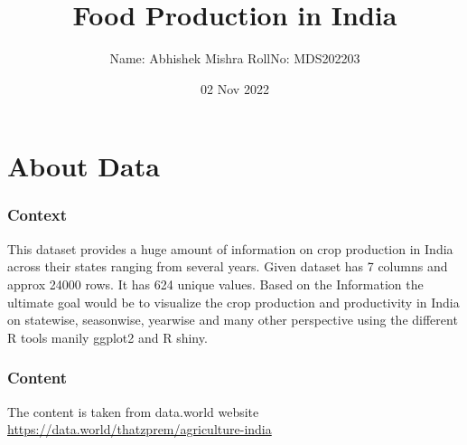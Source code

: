 \documentclass[
]{article}
\title{Food Production in India}
\author{Name: Abhishek Mishra \textbar{} RollNo: MDS202203}
\date{02 Nov 2022}
\begin{document}
\maketitle

\hypertarget{about-data}{%
\section{About Data}\label{about-data}}

\hypertarget{context}{%
\subsubsection{\texorpdfstring{\textbf{Context}}{Context}}\label{context}}

This dataset provides a huge amount of information on crop production in
India across their states ranging from several years. Given dataset has
7 columns and approx 24000 rows. It has 624 unique values. Based on the
Information the ultimate goal would be to visualize the crop production
and productivity in India on statewise, seasonwise, yearwise and many
other perspective using the different R tools manily ggplot2 and R
shiny.

\hypertarget{content}{%
\subsubsection{\texorpdfstring{\textbf{Content}}{Content}}\label{content}}

The content is taken from data.world website\\
\url{https://data.world/thatzprem/agriculture-india}

\hypertarget{section}{%
\section{}\label{section}}
\end{document}
